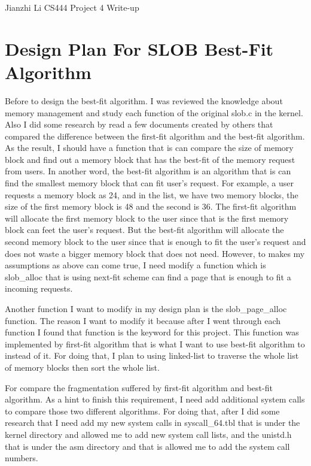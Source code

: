 \documentclass[letterpaper,11pt,titlepage]{article}
\begin{document}
Jianzhi Li\newline
CS444 Project 4 Write-up

\section{Design Plan For SLOB Best-Fit Algorithm}

Before to design the best-fit algorithm. I was reviewed the knowledge about memory management and study each function of the original slob.c in the kernel. Also I did 
some research by read a few documents created by others that compared the difference between the first-fit algorithm and the best-fit algorithm. As the result, I should have a 
function that is can compare the size of memory block and find out a memory block that has the best-fit of the memory request from users. In another word, the best-fit algorithm 
is an algorithm that is can find the smallest memory block that can fit user's request. For example, a user requests a memory block as 24, and in the list, we have two memory blocks, 
the size of the first memory block is 48 and the second is 36. The first-fit algorithm will allocate the first memory block to the user since that is the first memory block can
feet the user's request. But the best-fit algorithm will allocate the second memory block to the user since that is enough to fit the user's request and does not waste a bigger memory block 
that does not need. However, to makes my assumptions as above can come true, I need modify a function which is slob_alloc that is using next-fit scheme can find a page that is enough to fit a 
incoming requests.

Another function I want to modify in my design plan is the slob_page_alloc function. The reason I want to modify it because after I went through each function I found that function is the keyword
for this project. This function was implemented by first-fit algorithm that is what I want to use best-fit algorithm to instead of it. For doing that, I plan to using linked-list to traverse the whole list
of memory blocks then sort the whole list. 
    
For compare the fragmentation suffered by first-fit algorithm and best-fit algorithm. As a hint to finish this requirement, I need add additional system calls to compare those two different algorithms. For doing that,
after I did some research that I need add my new system calls in syscall_64.tbl that is under the kernel directory and allowed me to add new system call lists, and the unistd.h that is under the asm directory and that is allowed me to add the system call numbers.
\end{document}
